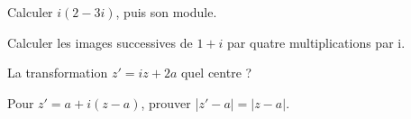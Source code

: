 \documentclass[11pt]{article}
\begin{document}
Calculer \(i(2-3i)\), puis son module.\par
\vspace{5pt}
Calculer les images successives de \(1+i\) par quatre multiplications par i.\par
\vspace{5pt}
La transformation \(z'=i z+2 a\) quel centre ?\par
\vspace{5pt}
Pour \(z'=a+i(z-a)\), prouver |\(z'-a|=|z-a|\).\par
\vspace{5pt}
\end{document}

